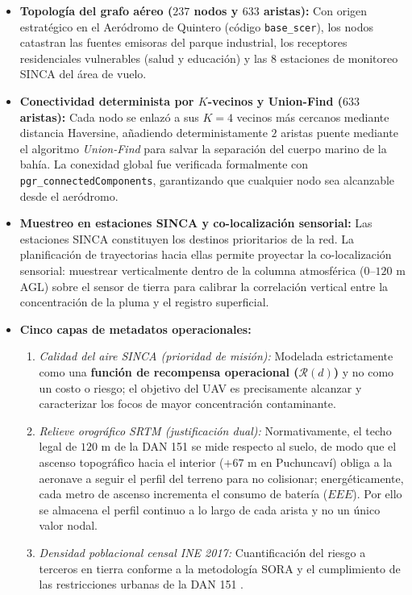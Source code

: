 \documentclass[letterpaper,12pt]{article}
\begin{document}
\begin{itemize}
    \item \textbf{Topología del grafo aéreo ($237$ nodos y $633$ aristas):} Con origen estratégico en el Aeródromo de Quintero (código \texttt{base\_scer}), los nodos catastran las fuentes emisoras del parque industrial, los receptores residenciales vulnerables (salud y educación) y las $8$ estaciones de monitoreo SINCA del área de vuelo.
    \item \textbf{Conectividad determinista por $K$-vecinos y Union-Find ($633$ aristas):} Cada nodo se enlazó a sus $K=4$ vecinos más cercanos mediante distancia Haversine, añadiendo deterministamente $2$ aristas puente mediante el algoritmo \textit{Union-Find} para salvar la separación del cuerpo marino de la bahía. La conexidad global fue verificada formalmente con \texttt{pgr\_connectedComponents}, garantizando que cualquier nodo sea alcanzable desde el aeródromo.
    \item \textbf{Muestreo en estaciones SINCA y co-localización sensorial:} Las estaciones SINCA constituyen los destinos prioritarios de la red. La planificación de trayectorias hacia ellas permite proyectar la co-localización sensorial: muestrear verticalmente dentro de la columna atmosférica ($0\text{--}120\text{ m}$ AGL) sobre el sensor de tierra para calibrar la correlación vertical entre la concentración de la pluma y el registro superficial.
    \item \textbf{Cinco capas de metadatos operacionales:}
    \begin{enumerate}
        \item \textit{Calidad del aire SINCA (prioridad de misión):} Modelada estrictamente como una \textbf{función de recompensa operacional ($\mathcal{R}(d)$)} y no como un costo o riesgo; el objetivo del UAV es precisamente alcanzar y caracterizar los focos de mayor concentración contaminante.
        \item \textit{Relieve orográfico SRTM (justificación dual):} Normativamente, el techo legal de $120\text{ m}$ de la DAN 151 se mide respecto al suelo, de modo que el ascenso topográfico hacia el interior ($+67\text{ m}$ en Puchuncaví) obliga a la aeronave a seguir el perfil del terreno para no colisionar; energéticamente, cada metro de ascenso incrementa el consumo de batería ($EEE$). Por ello se almacena el perfil continuo a lo largo de cada arista y no un único valor nodal.
        \item \textit{Densidad poblacional censal INE 2017:} Cuantificación del riesgo a terceros en tierra conforme a la metodología SORA \cite{sora} y el cumplimiento de las restricciones urbanas de la DAN 151 \cite{dan151}.

\end{enumerate}
\end{itemize}
\end{document}
